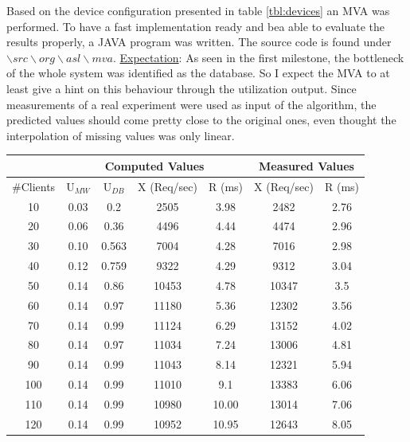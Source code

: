 \documentclass[11pt]{article}
\begin{document}
Based on the device configuration presented in table \ref{tbl:devices} an MVA was performed. To have a fast implementation ready and bea able to evaluate the results properly, a JAVA program was written. The source code is found under $\backslash src\backslash org\backslash asl\backslash mva$.
\newline\underline{Expectation}: As seen in the first milestone, the bottleneck of the whole system was identified as the database. So I expect the MVA to at least give a hint on this behaviour through the utilization output. Since measurements of a real experiment were used as input of the algorithm, the predicted values should come pretty close to the original ones, even thought the interpolation of missing values was only linear. 

\begin{center}
	\begin{tabular}{c|c|c|c|c||c|c}
		\hline
		& \multicolumn{4}{c||}{Computed Values} & \multicolumn{2}{c}{Measured Values} \\
		\hline
		\#Clients & U$_{MW}$ & U$_{DB}$ & X (Req/sec) & R (ms) & X (Req/sec) & R (ms) \\
		\hline
		10 & 0.03 & 0.2 & 2505 & 3.98 & 2482 & 2.76 \\
		20 & 0.06 & 0.36 & 4496 & 4.44 & 4474 & 2.96 \\
		30 & 0.10 & 0.563 & 7004 & 4.28 & 7016 & 2.98 \\
		40 & 0.12 & 0.759 & 9322 & 4.29 & 9312 & 3.04 \\
		50 & 0.14 & 0.86 & 10453 & 4.78 & 10347 & 3.5 \\
		60 & 0.14 & 0.97 & 11180 & 5.36 & 12302 & 3.56 \\
		70 & 0.14 & 0.99 & 11124 & 6.29 & 13152& 4.02 \\
		80 & 0.14 & 0.97 & 11034 & 7.24 & 13006 & 4.81 \\
		90 & 0.14 & 0.99 & 11043 & 8.14 & 12321 & 5.94 \\
		100 & 0.14 & 0.99 & 11010 & 9.1 & 13383 & 6.06 \\
		110 & 0.14 & 0.99 & 10980 & 10.00 & 13014 & 7.06 \\
		120 & 0.14 & 0.99 & 10952 & 10.95 & 12643 & 8.05 \\
		\hline		
	\end{tabular}
	\label{tbl:mva}
\end{center}
\end{document}
